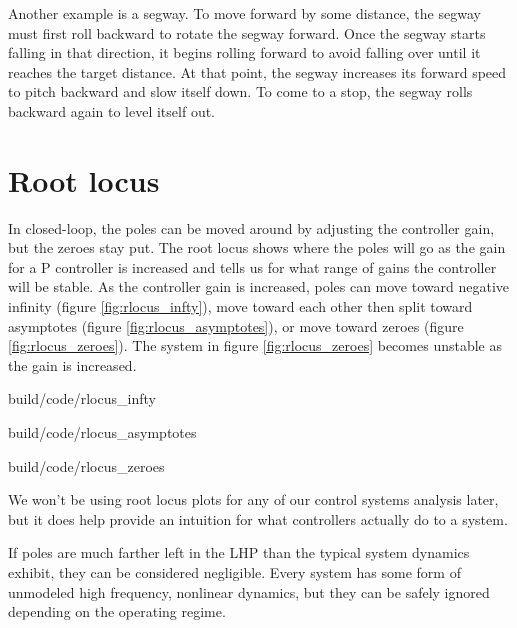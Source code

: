Another example is a segway. To move forward by some distance, the segway must
first roll backward to rotate the segway forward. Once the segway starts falling
in that direction, it begins rolling forward to avoid falling over until
it reaches the target distance. At that point, the segway increases its forward
speed to pitch backward and slow itself down. To come to a stop, the segway
rolls backward again to level itself out.

\section{Root locus} \label{sec:root_locus}

In closed-loop, the poles can be moved around by adjusting the controller gain,
but the zeroes stay put. The root locus shows where the poles will go as the
gain for a P controller is increased and tells us for what range of gains the
controller will be stable. As the controller gain is increased, poles can move
toward negative infinity (figure \ref{fig:rlocus_infty}), move toward each other
then split toward asymptotes (figure \ref{fig:rlocus_asymptotes}), or move
toward zeroes (figure \ref{fig:rlocus_zeroes}). The \gls{system} in figure
\ref{fig:rlocus_zeroes} becomes unstable as the gain is increased.

\begin{bookfigure}
  \begin{minisvg}{build/code/rlocus_infty}
    \caption{Root locus showing pole moving toward negative infinity}
    \label{fig:rlocus_infty}
  \end{minisvg}
  \hfill
  \begin{minisvg}{build/code/rlocus_asymptotes}
    \caption{Root locus showing poles moving toward asymptotes}
    \label{fig:rlocus_asymptotes}
  \end{minisvg}
  \hfill
  \begin{minisvg}{build/code/rlocus_zeroes}
    \caption{Root locus of equation (\ref{eq:transfer_func}) showing poles
      moving toward zeroes.}
    \label{fig:rlocus_zeroes}
  \end{minisvg}
\end{bookfigure}

We won't be using root locus plots for any of our control systems analysis
later, but it does help provide an intuition for what controllers actually do to
a system.

If poles are much farther left in the LHP than the typical \gls{system} dynamics
exhibit, they can be considered negligible. Every \gls{system} has some form of
unmodeled high frequency, nonlinear dynamics, but they can be safely ignored
depending on the operating regime.

